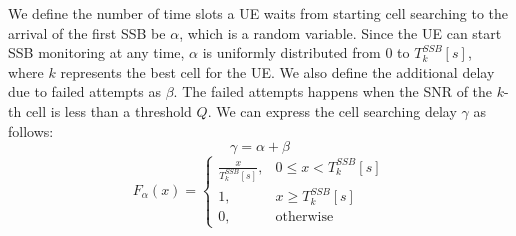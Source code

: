 We define the number of time slots a UE waits from starting cell searching to the arrival of the first SSB be $\alpha$, which is a random variable. Since the UE can start SSB monitoring at any time, $\alpha$ is uniformly distributed from $0$ to $T_{k}^{SSB}[s]$, where $k$ represents the best cell for the UE. We also define the additional delay due to failed attempts as $\beta$. The failed attempts happens when the SNR of the $k$-th cell is less than a threshold $Q$. We can express the cell searching delay $\gamma$ as follows:
\begin{equation}
    \gamma = \alpha + \beta
\end{equation}
\begin{equation}
    F_{\alpha}(x) =
    \begin{cases}
        \frac{x}{T_{k}^{SSB}[s]}, & 0 \leq x < T_{k}^{SSB}[s] \\
        1, & x \geq T_{k}^{SSB}[s] \\
        0, & \text{otherwise}
    \end{cases}
\end{equation}

